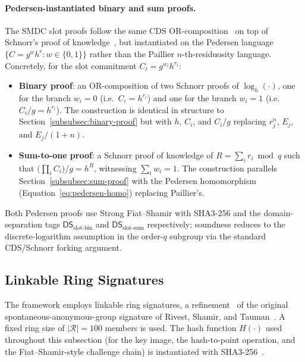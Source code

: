 \paragraph{Pedersen-instantiated binary and sum proofs.} The SMDC slot proofs follow the same CDS OR-composition~\cite{cramer1994or} on top of Schnorr's proof of knowledge~\cite{schnorr1991}, but instantiated on the Pedersen language $\{C = g^w h^r : w \in \{0,1\}\}$ rather than the Paillier $n$-th-residuosity language. Concretely, for the slot commitment $C_i = g^{w_i} h^{r_i}$:
\begin{itemize}
    \item \textbf{Binary proof}: an OR-composition of two Schnorr proofs of $\log_h(\cdot)$, one for the branch $w_i = 0$ (i.e.\ $C_i = h^{r_i}$) and one for the branch $w_i = 1$ (i.e.\ $C_i / g = h^{r_i}$). The construction is identical in structure to Section~\ref{subsubsec:binary-proof} but with $h$, $C_i$, and $C_i / g$ replacing $r_j^n$, $E_j$, and $E_j/(1+n)$.
    \item \textbf{Sum-to-one proof}: a Schnorr proof of knowledge of $R = \sum_i r_i \bmod q$ such that $\big(\prod_i C_i\big) / g = h^R$, witnessing $\sum_i w_i = 1$. The construction parallels Section~\ref{subsubsec:sum-proof} with the Pedersen homomorphism (Equation~\ref{eq:pedersen-homo}) replacing Paillier's.
\end{itemize}
Both Pedersen proofs use Strong Fiat--Shamir with SHA3-256 and the domain-separation tags $\mathsf{DS}_{\text{slot-bin}}$ and $\mathsf{DS}_{\text{slot-sum}}$ respectively; soundness reduces to the discrete-logarithm assumption in the order-$q$ subgroup via the standard CDS/Schnorr forking argument.

\subsection{Linkable Ring Signatures}
\label{subsec:ring-sig}

The framework employs linkable ring signatures, a refinement~\cite{liu2004} of the original spontaneous-anonymous-group signature of Rivest, Shamir, and Tauman~\cite{rivest2001ring}. A fixed ring size of $|\mathcal{R}| = 100$ members is used. The hash function $H(\cdot)$ used throughout this subsection (for the key image, the hash-to-point operation, and the Fiat--Shamir-style challenge chain) is instantiated with SHA3-256~\cite{nist_fips202}.

